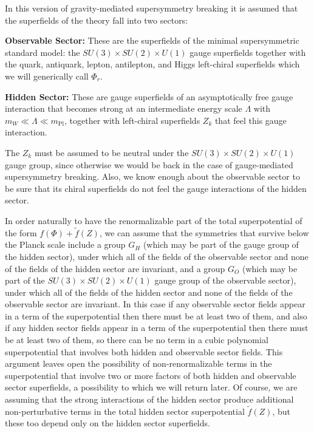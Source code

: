 In this version of gravity-mediated supersymmetry breaking it is assumed
that the superfields of the theory fall into two sectors:

\noindent\textbf{Observable Sector:} These are the superfields of the
minimal supersymmetric standard model: the
\(SU(3)\times SU(2)\times U(1)\) gauge superfields together with the quark,
antiquark, lepton, antilepton, and Higgs left-chiral superfields which we
will generically call \(\Phi_r\).

\noindent\textbf{Hidden Sector:} These are gauge superfields of an
asymptotically free gauge interaction that becomes strong at an intermediate
energy scale \(\Lambda\) with
\(m_W\ll\Lambda\ll m_{\mathrm{Pl}}\), together with left-chiral superfields
\(Z_k\) that feel this gauge interaction.

The \(Z_k\) must be assumed to be neutral under the
\(SU(3)\times SU(2)\times U(1)\) gauge group, since otherwise we would be back
in the case of gauge-mediated supersymmetry breaking. Also, we know enough
about the observable sector to be sure that its chiral superfields do not
feel the gauge interactions of the hidden sector.

In order naturally to have the renormalizable part of the total
superpotential of the form \(f(\Phi)+\widetilde f(Z)\), we can assume that
the symmetries that survive below the Planck scale include a group \(G_H\)
(which may be part of the gauge group of the hidden sector), under which all
of the fields of the observable sector and none of the fields of the hidden
sector are invariant, and a group \(G_O\) (which may be part of the
\(SU(3)\times SU(2)\times U(1)\) gauge group of the observable sector), under
which all of the fields of the hidden sector and none of the fields of the
observable sector are invariant. In this case if any observable sector
fields appear in a term of the superpotential then there must be at least
two of them, and also if any hidden sector fields appear in a term of the
superpotential then there must be at least two of them, so there can be no
term in a cubic polynomial superpotential that involves both hidden and
observable sector fields. This argument leaves open the possibility of
non-renormalizable terms in the superpotential that involve two or more
factors of both hidden and observable sector superfields, a possibility to
which we will return later. Of course, we are assuming that the strong
interactions of the hidden sector produce additional non-perturbative terms
in the total hidden sector superpotential \(\widetilde f(Z)\), but these too
depend only on the hidden sector superfields.

